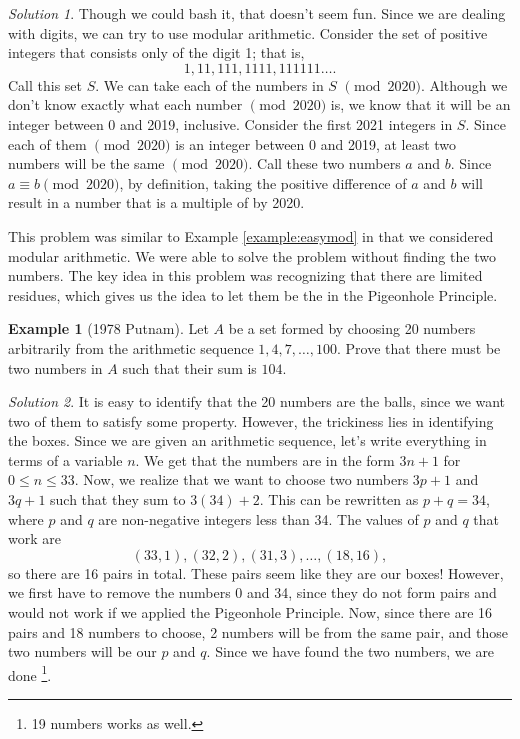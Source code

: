 \documentclass[l1pt]{article}
\theoremstyle{plain}
\theoremstyle{definition}
\newtheorem{example}[thm]{Example}
\theoremstyle{remark}
\newtheorem*{solution}{Solution}
\begin{document}
\begin{solution}
Though we could bash it, that doesn't seem fun. Since we are dealing with digits, we can try to use modular arithmetic. Consider the set of positive integers that consists only of the digit 1; that is, \[1, 11, 111, 1111, 111111\dots .\] Call this set $S$. We can take each of the numbers in $S$ $\pmod {2020}$. Although we don't know exactly what each number $\pmod {2020}$ is, we know that it will be an integer between 0 and 2019, inclusive. Consider the first 2021 integers in $S$. Since each of them $\pmod{2020}$ is an integer between 0 and 2019, at least two numbers will be the same $\pmod{2020}$. Call these two numbers $a$ and $b$. Since $a\equiv b \pmod{2020}$, by definition, taking the positive difference of $a$ and $b$ will result in a number that is a multiple of by 2020. 
\end{solution}

This problem was similar to Example \ref{example:easymod} in that we considered modular arithmetic. We were able to solve the problem without finding the two numbers. The key idea in this problem was recognizing that there are limited residues, which gives us the idea to let them be the  in the Pigeonhole Principle.

\begin{example}[1978 Putnam]
Let $A$ be a set formed by choosing 20 numbers arbitrarily from the arithmetic sequence $1, 4, 7, \dots, 100$. Prove that there must be two numbers in $A$ such that their sum is $104$.
\end{example}

\begin{solution}
It is easy to identify that the 20 numbers are the balls, since we want two of them to satisfy some property. However, the trickiness lies in identifying the boxes. Since we are given an arithmetic sequence, let's write everything in terms of a variable $n$. We get that the numbers are in the form $3n+1$ for $0\leq n \leq 33$. Now, we realize that we want to choose two numbers $3p+1$ and $3q+1$ such that they sum to $3(34)+2$. This can be rewritten as $p+q=34$, where $p$ and $q$ are non-negative integers less than 34. The values of $p$ and $q$ that work are \[(33, 1), (32, 2), (31, 3), \dots , (18, 16),\] so there are 16 pairs in total. These pairs seem like they are our boxes! However, we first have to remove the numbers 0 and 34, since they do not form pairs and would not work if we applied the Pigeonhole Principle. Now, since there are 16 pairs and 18 numbers to choose, 2 numbers will be from the same pair, and those two numbers will be our $p$ and $q$. Since we have found the two numbers, we are done \footnote{19 numbers works as well.}.
\end{solution}
\end{document}
